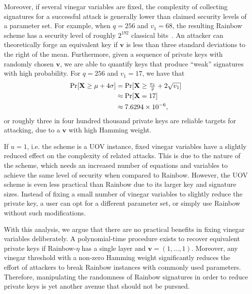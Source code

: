 \documentclass[12pt, a4paper, oneside]{memoir}
\theoremstyle{definition}
\begin{document}
Moreover, if several vinegar variables are fixed, the complexity of collecting signatures for a successful attack is generally lower than claimed security levels of a parameter set. For example, when $q = 256$ and $v_{1} = 68$, the resulting Rainbow scheme has a security level of roughly $2^{192}$ classical bits~\cite[p.~36]{Ding:201901}. An attacker can theoretically forge an equivalent key if $\mathbf{v}$ is less than three standard deviations to the right of the mean. Furthermore, given a sequence of private keys with randomly chosen $\mathbf{v}$, we are able to quantify keys that produce ``weak'' signatures with high probability. For $q = 256$ and $v_{1} = 17$, we have that
\begin{align*}
  \begin{split}
    \Pr[\mathbf{X} \geq \mu + 4\sigma]
      &= \Pr[\mathbf{X} \geq \tfrac{v_{1}}{2} + 2 \sqrt{v_{1}}] \\
      &\approx \Pr[\mathbf{X} = 17] \\
      &\approx \num[round-mode=places,round-precision=4]{7.62939453125E-6},
  \end{split}
\end{align*}
or roughly three in four hundred thousand private keys are reliable targets for attacking, due to a $\mathbf{v}$ with high Hamming weight.

If $u = 1$, i.e. the scheme is a UOV instance, fixed vinegar variables have a slightly reduced effect on the complexity of related attacks. This is due to the nature of the scheme, which needs an increased number of equations and variables to achieve the same level of security when compared to Rainbow. However, the UOV scheme is even less practical than Rainbow due to its larger key and signature sizes. Instead of fixing a small number of vinegar variables to slightly reduce the private key, a user can opt for a different parameter set, or simply use Rainbow without such modifications.

With this analysis, we argue that there are no practical benefits in fixing vinegar variables deliberately. A polynomial-time procedure exists to recover equivalent private keys if Rainbow-$\eta$ has a single layer and $\mathbf{v} = (1, \dots, 1)$. Moreover, any vinegar threshold with a non-zero Hamming weight significantly reduces the effort of attackers to break Rainbow instances with commonly used parameters. Therefore, manipulating the randomness of Rainbow signatures in order to reduce private keys is yet another avenue that should not be pursued.
\end{document}
